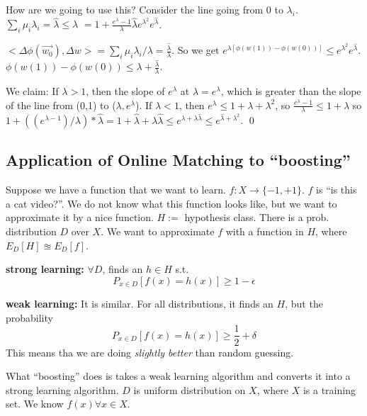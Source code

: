 How are we going to use this? Consider the line going from $0$ to $\lambda_{i}$.
$\sum_{i} \mu_{i} \lambda_{i} = \hat \lambda \leq \lambda$ $=1 + \frac{e^{\lambda } - 1}{\lambda} \hat \lambda  e^{\lambda^{2}} e^{\hat \lambda}$.

$<\Delta \phi(\vec{w_{0}}), \Delta w> = \sum_{i}  \mu_{i} \lambda_{i}/\lambda = \frac{\hat \lambda}{\lambda}$.
So we get $e^{\lambda [ \phi(w(1)) - \phi(w(0))]}  \leq e^{\lambda^{2}} e^{\hat \lambda}$. $\phi(w(1)) - \phi(w(0)) \leq \lambda + \frac{\hat \lambda}{\lambda}$.

We claim: If $\lambda > 1$, then the slope of $e^{\lambda}$ at $\lambda = e^{\lambda}$, which is greater than the slope of the line from (0,1) to ($\lambda, e^{\lambda}$). If $\lambda < 1$, then $e^{\lambda} \leq 1 + \lambda + \lambda^{2}$, so $\frac{e^{\lambda} - 1}{\lambda} \leq 1 + \lambda $ so $1 + ((e^{\lambda-1})/\lambda) * \hat \lambda = 1 + \hat \lambda + \lambda \hat \lambda \leq e^{\lambda + \lambda \hat \lambda} \leq e^{\hat \lambda + \lambda^{2}}$.  \qed


\subsection{Application of Online Matching to ``boosting''}
Suppose we have a function that we want to learn.
$f: X \rightarrow \{-1,+1\}$.
$f$ is ``is this a cat video?''.
We do not know what this function looks like, but we want to approximate it by a nice function.
$H := $ hypothesis class.
There is a prob. distribution $D$ over $X$.
We want to approximate $f$ with a function in $H$, where $E_{D}[H] \approxeq E_{D}[f]$.

\textbf{strong learning:} $\forall D$, finds an $h \in H$ s.t.
\begin{equation}
  \label{eq:strong-learning}
  P_{x \in D}[f(x) = h(x)] \geq 1 - \epsilon
\end{equation}

\textbf{weak learning:} It is similar. For all distributions, it finds an $H$, but the probability
\begin{equation}
  \label{eq:weak-learning}
  P_{x \in D}[f(x) = h(x)] \geq \frac{1}{2} + \delta
\end{equation}
This means tha we are doing \textit{slightly better} than random guessing.

What ``boosting'' does is takes a weak learning algorithm and converts it into a strong learning algorithm.
$D$ is  uniform distribution on $X$, where $X$ is a training set. 
We know $f(x) \forall x \in X$.


